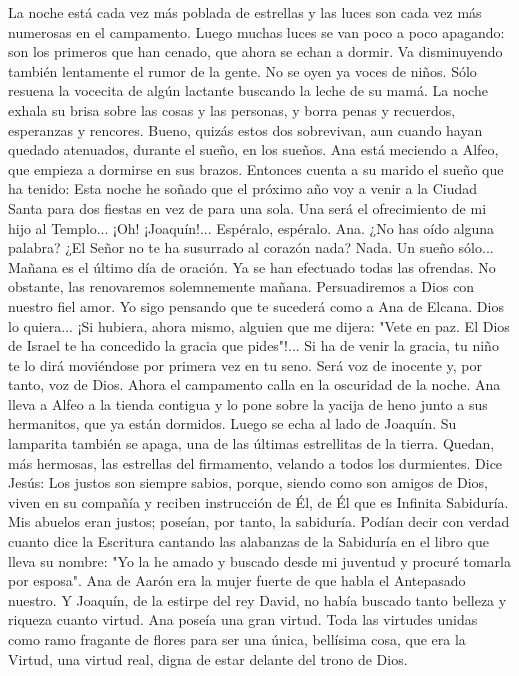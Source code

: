 \documentclass[12pt]{book} %
\begin{document}
La noche está cada vez más poblada de estrellas y las luces son cada vez más numerosas en el campamento. Luego muchas luces se van poco a poco apagando: son los primeros que han cenado, que ahora se echan a dormir. Va disminuyendo también lentamente el rumor de la gente. No se oyen ya voces de niños. Sólo resuena la vocecita de algún lactante buscando la leche de su mamá. La noche exhala su brisa sobre las cosas y las personas, y borra penas y recuerdos, esperanzas y rencores. 
Bueno, quizás estos dos sobrevivan, aun cuando hayan quedado atenuados, durante el sueño, en los sueños. 
Ana está meciendo a Alfeo, que empieza a dormirse en sus brazos. Entonces cuenta a su marido el sueño que ha tenido: 
Esta noche he soñado que el próximo año voy a venir a la Ciudad Santa para dos fiestas en vez de para una sola. Una 
será el ofrecimiento de mi hijo al Templo... ¡Oh! ¡Joaquín!... 
Espéralo, espéralo. Ana. ¿No has oído alguna palabra? ¿El Señor no te ha susurrado al corazón nada? 
Nada. Un sueño sólo... 
Mañana es el último día de oración. Ya se han efectuado todas las ofrendas. No obstante, las renovaremos 
solemnemente mañana. Persuadiremos a Dios con nuestro fiel amor. Yo sigo pensando que te sucederá como a Ana de Elcana.          
Dios lo quiera... ¡Si hubiera, ahora mismo, alguien que me dijera: "Vete en paz. El Dios de Israel te ha concedido la 
gracia que pides"!... 
Si ha de venir la gracia, tu niño te lo dirá moviéndose por primera vez en tu seno. Será voz de inocente y, por tanto, 
voz de Dios. 
Ahora el campamento calla en la oscuridad de la noche. Ana lleva a Alfeo a la tienda contigua y lo pone sobre la yacija 
de heno junto a sus hermanitos, que ya están dormidos. Luego se echa al lado de Joaquín. Su lamparita también se apaga, una de las últimas estrellitas de la tierra. Quedan, más hermosas, las estrellas del firmamento, velando a todos los durmientes. 
Dice Jesús: 
Los justos son siempre sabios, porque, siendo como son amigos de Dios, viven en su compañía y reciben instrucción de Él, de Él que es Infinita Sabiduría. 
Mis abuelos eran justos; poseían, por tanto, la sabiduría. Podían decir con verdad cuanto dice la Escritura cantando las 
alabanzas de la Sabiduría en el libro que lleva su nombre: "Yo la he amado y buscado desde mi juventud y procuré tomarla por esposa". 
Ana de Aarón era la mujer fuerte de que habla el Antepasado nuestro. Y Joaquín, de la estirpe del rey David, no había 
buscado tanto belleza y riqueza cuanto virtud. Ana poseía una gran virtud. Toda las virtudes unidas como ramo fragante de flores para ser una única, bellísima cosa, que era la Virtud, una virtud real, digna de estar delante del trono de Dios. 
\end{document}
